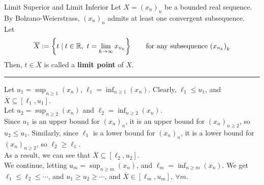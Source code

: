 \documentclass[8pt]{extarticle}
\newcommand{\R}{\mathbb{R}}
\begin{document}
  \begin{problem}{Limit Superior and Limit Inferior}
    Let $X = (x_n)_n$ be a bounded real sequence. By Bolzano-Weierstrass, $(x_n)_n$ admits at least one convergent subsequence.\\

    Let
    \begin{align*}
      \overline{X} := \left\{t \mid t\in\R,~t = \lim_{k\rightarrow\infty}x_{n_k}\right\} \tag*{for any subsequence $\left(x_{n_k}\right)_k$}
    \end{align*}
    Then, $t\in\overline{X}$ is called a \textbf{limit point} of $X$.\\
    \vspace{4pt}
    \rule{\textwidth}{0.4pt}
    \vspace{4pt}
    Let $u_1 = \sup_{n\geq 1}(x_n)$, $\ell_1 = \inf_{n\geq 1}(x_n)$. Clearly, $\ell_1 \leq u_1$, and $\overline{X} \subseteq [\ell_1,u_1]$.\\

    Let $u_2 = \sup_{n\geq 2}(x_n)$ and $\ell_2 = \inf_{n\geq 2}(x_n)$.\\

    Since $u_1$ is an upper bound for $(x_n)_{n}$, it is an upper bound for $(x_n)_{n\geq 2}$, so $u_2 \leq u_1$. Similarly, since $\ell_1$ is a lower bound for $(x_n)_n$, it is a lower bound for $(x_n)_{n\geq 2}$, so $\ell_2 \geq \ell_1$.\\

    As a result, we can see that $\overline{X} \subseteq [\ell_2,u_2]$.\\

    We continue, letting $u_m = \sup_{n\geq m}(x_n)$, and $\ell_m = \inf_{n\geq m}(x_n)$. We get $\ell_1 \leq \ell_2 \leq \cdots$, and $u_1 \geq u_2 \geq \cdots$, and $\overline{X} \in [\ell_m,u_m],~\forall m$.\\


\end{problem}
\end{document}
